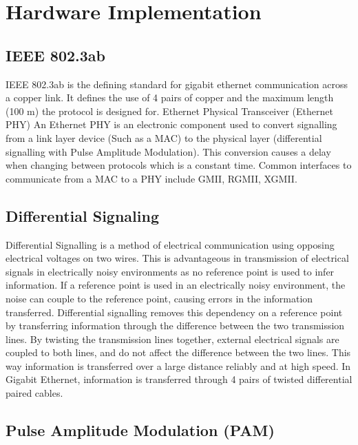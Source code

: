 \section{Hardware Implementation}

\subsection{IEEE 802.3ab}

\par IEEE 802.3ab is the defining standard for gigabit ethernet communication across a copper link. 
It defines the use of 4 pairs of copper and the maximum length (100 m) the protocol is designed for.
Ethernet Physical Transceiver (Ethernet PHY)
An Ethernet PHY is an electronic component used to convert signalling from a link layer device (Such as a MAC) 
to the physical layer (differential signalling with Pulse Amplitude Modulation). This conversion causes a delay when 
changing between protocols which is a constant time. Common interfaces to communicate from a MAC to a PHY include 
GMII, RGMII, XGMII.

\subsection{Differential Signaling}

\par Differential Signalling is a method of electrical communication using opposing electrical voltages on two wires. 
This is advantageous in transmission of electrical signals in electrically noisy environments as no reference 
point is used to infer information. If a reference point is used in an electrically noisy environment, the 
noise can couple to the reference point, causing errors in the information transferred. Differential signalling 
removes this dependency on a reference point by transferring information through the difference between the two 
transmission lines. By twisting the transmission lines together, external electrical signals are coupled to both 
lines, and do not affect the difference between the two lines. This way information is transferred over a large 
distance reliably and at high speed. In Gigabit Ethernet, information is transferred through 4 pairs of twisted 
differential paired cables.

\subsection{Pulse Amplitude Modulation (PAM)}

